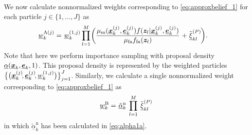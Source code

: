 \documentclass[10pt, twoside, romanappendices]{IEEEtran}
\providecommand{\ist}{\hspace*{.3mm}}
\providecommand{\rmv}{\hspace*{-.3mm}}
\providecommand{\nn}{\nonumber}
\begin{document}
We now calculate nonnormalized weights \vspace{-1.5mm} corresponding \vspace{1.5mm} to \eqref{eq:approxbelief_1} for each particle $j \in \{1,\dots,J\}$ \vspace{1mm} as
\begin{align}
\hspace{0mm}\underline{w}^{\text{A}(j)}_{k} &=\ist \underline{w}^{(1,j)}_{k} \prod^{M}_{l=1} \rmv \bigg(  \frac{\mu_{\mathrm{m}}(\underline{\V{x}}^{(j)}_{k},\underline{\V{e}}^{(j)}_{k}) f(\V{z}_{l}| \underline{\V{x}}^{(j)}_k, \underline{\V{e}}^{(j)}_{k})}{\mu_{\mathrm{fa}}  f_{\mathrm{fa}}(\V{z}_{l})} \ist + \ist \tilde{\underline{\xi}}_{kl}^{(P)} \rmv \bigg). \label{eq:weightsA}%
\end{align}
Note that here we perform importance sampling with proposal density $\underline{\alpha}(\underline{\bm{x}}_{k},\underline{\bm{e}}_{k},1)$. This proposal density is represented \vspace{.3mm} by the weighted particles 
$\big\{ \big( \underline{\V{x}}^{(j)}_{k}\rmv\rmv, \underline{\V{e}}^{(j)}_{k}\rmv\rmv, \underline{w}^{(1,j)}_{k} \big) \big\}_{j=1}^{J}$. Similarly, we calculate a single nonnormalized weight corresponding to \eqref{eq:approxbelief_1} 
\vspace{-2.5mm}
as
\begin{equation}
\underline{w}^{\text{B}}_{k} =\ist \tilde{\underline{\alpha}}^{\mathrm{n}}_k \ist\ist\ist \prod^{M}_{l=1}  \ist\ist\ist  \tilde{\underline{\xi}}_{kl}^{(P)}
\label{eq:wConstant}
\vspace{-1.5mm}
\end{equation}
in which $ \tilde{\underline{\alpha}}^{\mathrm{n}}_k$ has been calculated in \eqref{eq:alpha1a}.

\end{document}
